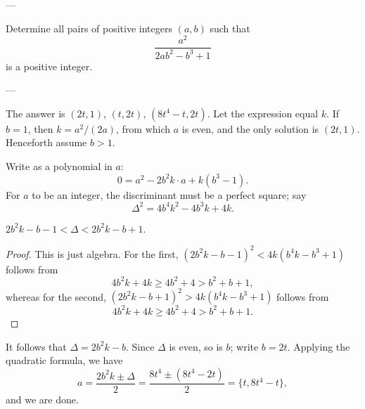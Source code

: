 
---

Determine all pairs of positive integers $(a,b)$ such that \[\frac{a^2}{2ab^2-b^3+1}\]
is a positive integer.

---

The answer is $(2t,1)$, $(t,2t)$, $(8t^4-t,2t)$. Let the expression equal $k$. If $b=1$, then $k=a^2/(2a)$, from which $a$ is even, and the only solution is $(2t,1)$. Henceforth assume $b>1$.

Write as a polynomial in $a$: \[0=a^2-2b^2k\cdot a+k(b^3-1).\]
For $a$ to be an integer, the discriminant must be a perfect square; say \[\Delta^2=4b^4k^2-4b^3k+4k.\]
\begin{iclaim*}
    $2b^2k-b-1<\Delta<2b^2k-b+1$.
\end{iclaim*}
\begin{proof}
    This is just algebra. For the first, $(2b^2k-b-1)^2<4k(b^4k-b^3+1)$ follows from \[4b^2k+4k\ge4b^2+4>b^2+b+1,\]
    whereas for the second, $(2b^2k-b+1)^2>4k(b^4k-b^3+1)$ follows from \[4b^2k+4k\ge4b^2+4>b^2+b+1.\]
\end{proof}

It follows that $\Delta=2b^2k-b$. Since $\Delta$ is even, so is $b$; write $b=2t$. Applying the quadratic formula, we have \[a=\frac{2b^2k\pm\Delta}2=\frac{8t^4\pm\left(8t^4-2t\right)}2=\{t,8t^4-t\},\]
and we are done.

